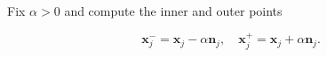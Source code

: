 Fix $\alpha > 0$ and compute the inner and outer points

$$
\bm{x}_j^- = \bm{x}_j - \alpha \bm{n}_j, \quad \bm{x}_j^+ = \bm{x}_j + \alpha \bm{n}_j.
$$

\begin{solution}
    \ \\
    \vfill
\end{solution}
